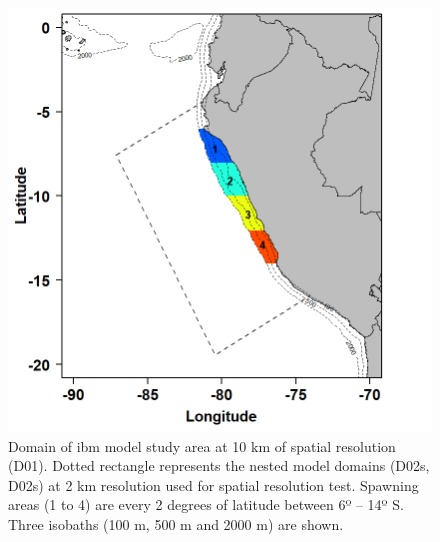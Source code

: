 \begin{figure}[ht]
	\includegraphics[width=1.0\textwidth]{figures/Chap2SpawningZone.png}
	\centering
	\caption{Domain of \acrshort{ibm} model study area at 10 km of spatial resolution (D01). Dotted rectangle represents the nested model domains (D02s, D02s) at 2 km resolution used for spatial resolution test. Spawning areas (1 to 4) are every 2 degrees of latitude between 6º – 14º S. Three isobaths (100 m, 500 m and 2000 m) are shown.}
	\label{Chap2SpawningZone}
\end{figure}

